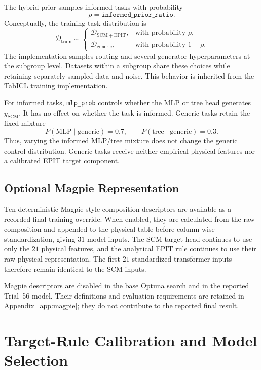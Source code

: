 \documentclass{article}
\begin{document}
The hybrid prior samples informed tasks with probability
\[
\rho=\texttt{informed\_prior\_ratio}.
\]
Conceptually, the training-task distribution is
\begin{equation}
\mathcal{D}_{\mathrm{train}}\sim
\begin{cases}
\mathcal{D}_{\mathrm{SCM+EPIT}},&\text{with probability }\rho,\\
\mathcal{D}_{\mathrm{generic}},&\text{with probability }1-\rho.
\end{cases}
\label{eq:hybrid-routing}
\end{equation}
The implementation samples routing and several generator hyperparameters at
the subgroup level. Datasets within a subgroup share these choices while
retaining separately sampled data and noise. This behavior is inherited from
the TabICL training implementation.

For informed tasks, \texttt{mlp\_prob} controls whether the MLP or tree head
generates \(y_{\mathrm{SCM}}\). It has no effect on whether the task is
informed. Generic tasks retain the fixed mixture
\[
P(\mathrm{MLP}\mid\mathrm{generic})=0.7,
\qquad P(\mathrm{tree}\mid\mathrm{generic})=0.3.
\]
Thus, varying the informed MLP/tree mixture does not change the generic
control distribution. Generic tasks receive neither empirical physical
features nor a calibrated EPIT target component.

\subsection{Optional Magpie Representation}

Ten deterministic Magpie-style composition descriptors are available as a
recorded final-training override. When enabled, they are calculated from the
raw composition and appended to the physical table before column-wise
standardization, giving \(31\) model inputs. The SCM target head continues to
use only the \(21\) physical features, and the analytical EPIT rule continues
to use their raw physical representation. The first \(21\) standardized
transformer inputs therefore remain identical to the SCM inputs.

Magpie descriptors are disabled in the base Optuna search and in the reported
Trial~56 model. Their definitions and evaluation requirements are retained in
Appendix~\ref{app:magpie}; they do not contribute to the reported final result.

\section{Target-Rule Calibration and Model Selection}
\label{sec:model-selection}
\end{document}
